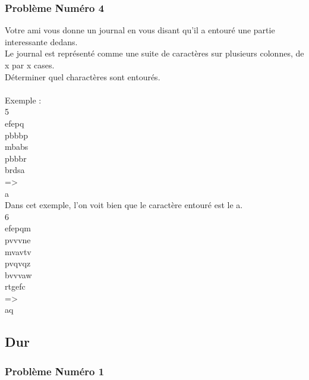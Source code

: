 \documentclass[12pt]{article}
\begin{document}
\subsubsection{Problème Numéro 4}

Votre ami vous donne un journal en vous disant qu'il a entouré une partie interessante dedans.\\
Le journal est représenté comme une suite de caractères sur plusieurs colonnes, de x par x cases.\\
Déterminer quel charactères sont entourés.
\\\\
Exemple :\\
5\\
efepq\\
pbbbp\\
mbabs\\
pbbbr\\
brdsa\\
=\textgreater\\
a\\
Dans cet exemple, l'on voit bien que le caractère entouré est le a.\\
6\\
efepqm\\
pvvvne\\
mvavtv\\
pvqvqz\\
bvvvaw\\
rtgefc\\
=\textgreater\\
aq

\subsection{Dur}

\subsubsection{Problème Numéro 1}
\end{document}
